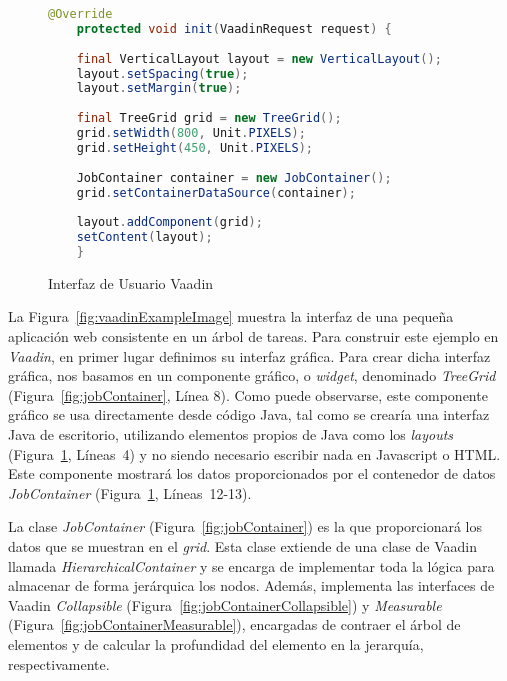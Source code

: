 \begin{figure}[!tb]
	\centering
	\begin{lstlisting}[language=Java]
	@Override
	protected void init(VaadinRequest request) {
	
	final VerticalLayout layout = new VerticalLayout();
	layout.setSpacing(true);
	layout.setMargin(true);
	
	final TreeGrid grid = new TreeGrid();
	grid.setWidth(800, Unit.PIXELS);
	grid.setHeight(450, Unit.PIXELS);
	
	JobContainer container = new JobContainer();
	grid.setContainerDataSource(container);
	
	layout.addComponent(grid);
	setContent(layout);
	}\end{lstlisting}
	\vspace{-15pt}
	\caption{Interfaz de Usuario Vaadin}
	\label{fig:uiVaadin}
\end{figure}

La Figura~\ref{fig:vaadinExampleImage} muestra la interfaz de una pequeña aplicación web consistente en un árbol de tareas. Para construir este ejemplo en \emph{Vaadin}, en primer lugar definimos su interfaz gráfica. Para crear dicha interfaz gráfica, nos basamos en un componente gráfico, o \emph{widget}, denominado \emph{TreeGrid}  (Figura~\ref{fig:jobContainer}, Línea 8). Como puede observarse, este componente gráfico se usa directamente desde código Java, tal como se crearía una interfaz Java de escritorio, utilizando elementos propios de Java como los \emph{layouts} (Figura~\ref{fig:uiVaadin}, Líneas~4) y no siendo necesario escribir nada en Javascript o HTML. Este componente mostrará los datos proporcionados por el contenedor de datos \emph{JobContainer} (Figura~\ref{fig:uiVaadin}, Líneas~12-13).

La clase \emph{JobContainer} (Figura~\ref{fig:jobContainer}) es la que proporcionará los datos que se muestran en el \emph{grid}. Esta clase extiende de una clase de Vaadin llamada \emph{HierarchicalContainer} y se encarga de implementar toda la lógica para almacenar de forma jerárquica los nodos. Además, implementa las interfaces de Vaadin \emph{Collapsible} (Figura~\ref{fig:jobContainerCollapsible}) y \emph{Measurable} (Figura~\ref{fig:jobContainerMeasurable}), encargadas de contraer el árbol de elementos y de calcular la profundidad del elemento en la jerarquía, respectivamente.

